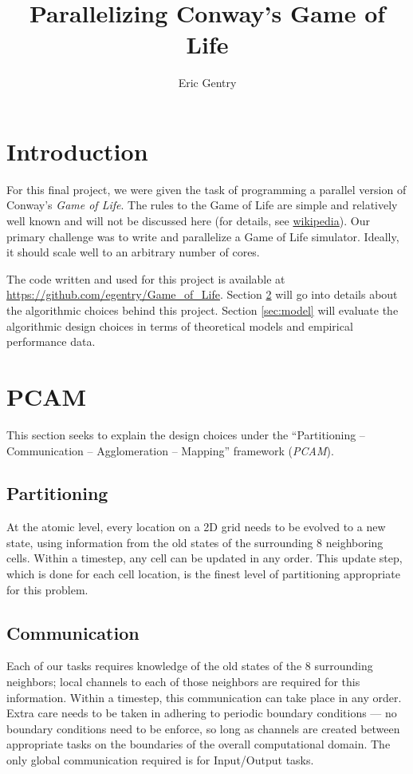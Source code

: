 \documentclass[iop, apj]{emulateapj}
\begin{document}
\title{Parallelizing Conway's Game of Life}

\author{Eric Gentry}

\section{Introduction}

For this final project, we were given the task of programming a parallel version of Conway's \emph{Game of Life}.  The rules to the Game of Life are simple and relatively well known and will not be discussed here (for details, see \href{https://en.wikipedia.org/wiki/Conway\%27s_Game_of_Life}{wikipedia}). Our primary challenge was to write and parallelize a Game of Life simulator.  Ideally, it should scale well to an arbitrary number of cores.

The code written and used for this project is available at \url{https://github.com/egentry/Game_of_Life}.  Section \ref{sec:PCAM} will go into details about the algorithmic choices behind this project. Section \ref{sec:model} will evaluate the algorithmic design choices in terms of theoretical models and empirical performance data.

\section{PCAM}
\label{sec:PCAM}

This section seeks to explain the design choices under the ``Partitioning -- Communication -- Agglomeration -- Mapping'' framework (\emph{PCAM}).

\subsection{Partitioning}

At the atomic level, every location on a 2D grid needs to be evolved to a new state, using information from the old states of the surrounding 8 neighboring cells.  Within a timestep, any cell can be updated in any order.  This update step, which is done for each cell location, is the finest level of partitioning appropriate for this problem.

\subsection{Communication}

Each of our tasks requires knowledge of the old states of the 8 surrounding neighbors; local channels to each of those neighbors are required for this information.  Within a timestep, this communication can take place in any order. Extra care needs to be taken in adhering to periodic boundary conditions --- no boundary conditions need to be enforce, so long as channels are created between appropriate tasks on the boundaries of the overall computational domain.  The only global communication required is for Input/Output tasks.
\end{document}
